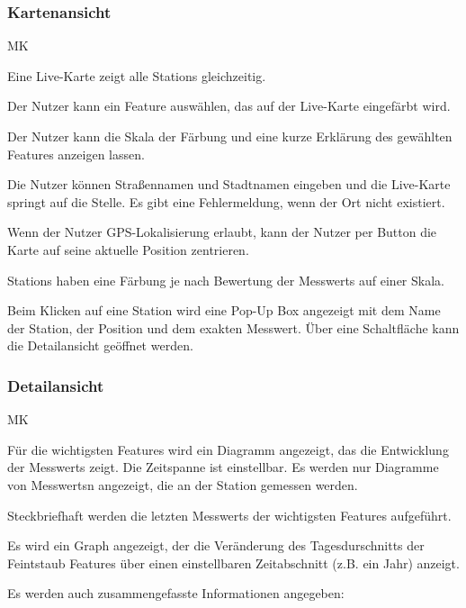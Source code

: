 \subsubsection*{\gls{Kartenansicht}}
\begin{Kriterien}{MK}

	\item Eine \gls{Live-Karte} zeigt alle \glspl{Station} gleichzeitig. 
	
	\item Der Nutzer kann ein \gls{Feature} auswählen, das auf der \gls{Live-Karte} eingefärbt wird.
	
	\item Der Nutzer kann die Skala der Färbung und eine kurze Erklärung des gewählten \gls{Feature}s anzeigen lassen.
	
	\item Die Nutzer können Straßennamen und Stadtnamen eingeben und die \gls{Live-Karte} springt auf die Stelle. 
		Es gibt eine Fehlermeldung, wenn der Ort nicht existiert.
	
	\item Wenn der Nutzer GPS-Lokalisierung erlaubt, kann der Nutzer per Button die Karte auf seine aktuelle Position zentrieren.

	\item \glspl{Station} haben eine Färbung je nach Bewertung der \glspl{Messwert} auf einer Skala.
	
	\item Beim Klicken auf eine \gls{Station} wird eine \gls{Pop-Up} Box angezeigt mit dem Name der Station, der Position und dem exakten \gls{Messwert}.
		Über eine Schaltfläche kann die \gls{Detailansicht} geöffnet werden. 
\end{Kriterien}

\subsubsection*{\gls{Detailansicht}}
\begin{Kriterien}{MK}
	\item Für die wichtigsten \glspl{Feature} wird ein Diagramm angezeigt, das die Entwicklung der \glspl{Messwert} zeigt. 
	Die Zeitspanne ist einstellbar. Es werden nur Diagramme von \glspl{Messwert}n angezeigt, die an der \gls{Station} gemessen 
	werden.
	
	\item Steckbriefhaft werden die letzten \glspl{Messwert} der wichtigsten \glspl{Feature} aufgeführt.

	\item Es wird ein \gls{Graph} angezeigt, der die Veränderung des Tagesdurschnitts der Feintstaub \glspl{Feature} über einen 
	einstellbaren Zeitabschnitt (z.B. ein Jahr) anzeigt.

	\item Es werden auch zusammengefasste Informationen angegeben: 
\end{Kriterien}
		
